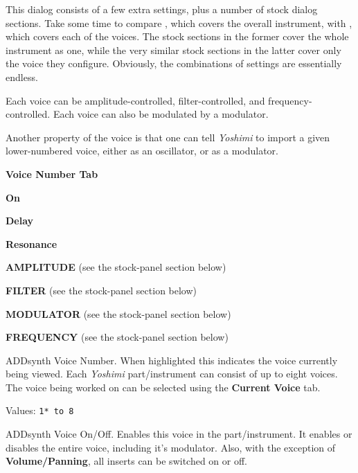    This dialog consists of a few extra settings, plus a number of
   stock dialog sections.  Take some time to compare
   ,
   which covers the overall instrument, with
   ,
   which covers each of the voices.
   The stock sections in the former cover the whole instrument as one,
   while the very similar stock sections in the latter cover only the
   voice they configure.
   Obviously, the combinations of settings are essentially endless.

   Each voice can be amplitude-controlled, filter-controlled, and
   frequency-controlled.  Each voice can also be modulated by a
   modulator.

  Another property of the voice is that one can tell \textsl{Yoshimi} to
  import a given lower-numbered voice, either as an oscillator, or as a
  modulator.

   \begin{enumber}
      \item \textbf{Voice Number Tab}
      \item \textbf{On}
      \item \textbf{Delay}
      \item \textbf{Resonance}
      \item \textbf{AMPLITUDE} (see the stock-panel section below)
      \item \textbf{FILTER} (see the stock-panel section below)
      \item \textbf{MODULATOR} (see the stock-panel section below)
      \item \textbf{FREQUENCY} (see the stock-panel section below)
   \end{enumber}

   \setcounter{ItemCounter}{0}      %

   ADDsynth Voice Number.
   When highlighted this indicates the voice currently being viewed.  Each
   \textsl{Yoshimi} part/instrument can consist of up to eight voices. The
   voice being worked on can be selected using the \textbf{Current Voice} tab.

   Values: \texttt{1* to 8}

   ADDsynth Voice On/Off.
   Enables this voice in the part/instrument.
   It enables or disables the entire voice, including it's modulator.
   Also, with the exception of \textbf{Volume/Panning},
   all inserts can be switched on or off.

